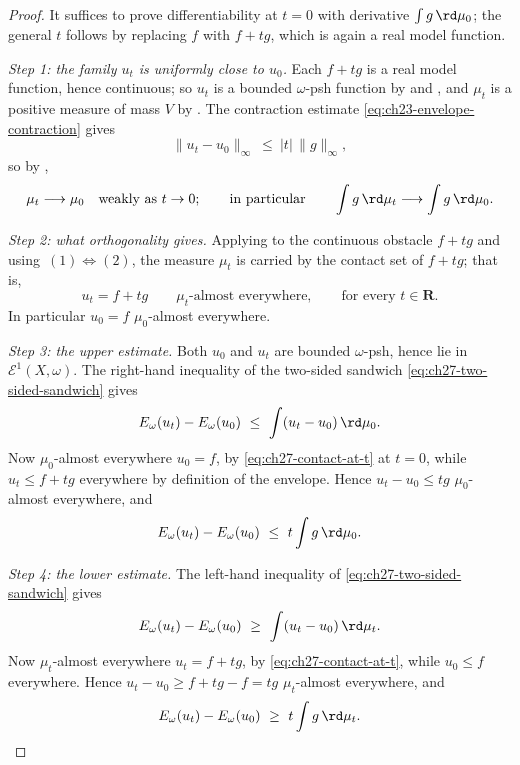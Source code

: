 \begin{proof}
It suffices to prove differentiability at $t=0$ with derivative
$\int g\,\rd\mu_0$; the general $t$ follows by replacing $f$ with
$f+tg$, which is again a real model function.

\emph{Step 1: the family $u_t$ is uniformly close to $u_0$.}
Each $f+tg$ is a real model function, hence continuous; so
$u_t$ is a bounded $\omega$-psh function by
 and
, and $\mu_t$ is a positive measure of
mass $V$ by .  The contraction estimate
\eqref{eq:ch23-envelope-contraction} gives
\begin{equation}\label{eq:ch27-envelope-lipschitz-in-t}
 \lVert u_t-u_0\rVert_\infty\ \leq\ |t|\,\lVert g\rVert_\infty ,
\end{equation}
so by ,
\begin{equation}\label{eq:ch27-measures-converge}
 \mu_t\longrightarrow\mu_0
 \quad\text{weakly as }t\to0;
 \qquad\text{in particular}\qquad
 \int g\,\rd\mu_t\longrightarrow\int g\,\rd\mu_0 .
\end{equation}

\emph{Step 2: what orthogonality gives.}
Applying  to the continuous obstacle
$f+tg$ and using
\,$(1)\Leftrightarrow(2)$, the
measure $\mu_t$ is carried by the contact set of $f+tg$; that is,
\begin{equation}\label{eq:ch27-contact-at-t}
 u_t=f+tg
 \qquad\mu_t\text{-almost everywhere},
 \qquad\text{for every }t\in\mathbf R .
\end{equation}
In particular $u_0=f$ $\mu_0$-almost everywhere.

\emph{Step 3: the upper estimate.}
Both $u_0$ and $u_t$ are bounded $\omega$-psh, hence lie in
$\mathcal E^1(X,\omega)$.  The right-hand inequality of the two-sided
sandwich \eqref{eq:ch27-two-sided-sandwich} gives
\[
 E_\omega(u_t)-E_\omega(u_0)\ \leq\ \int(u_t-u_0)\,\rd\mu_0 .
\]
Now $\mu_0$-almost everywhere $u_0=f$, by \eqref{eq:ch27-contact-at-t}
at $t=0$, while $u_t\leq f+tg$ everywhere by definition of the envelope.
Hence $u_t-u_0\leq tg$ $\mu_0$-almost everywhere, and
\begin{equation}\label{eq:ch27-upper-estimate}
 E_\omega(u_t)-E_\omega(u_0)\ \leq\ t\int g\,\rd\mu_0 .
\end{equation}

\emph{Step 4: the lower estimate.}
The left-hand inequality of \eqref{eq:ch27-two-sided-sandwich} gives
\[
 E_\omega(u_t)-E_\omega(u_0)\ \geq\ \int(u_t-u_0)\,\rd\mu_t .
\]
Now $\mu_t$-almost everywhere $u_t=f+tg$, by
\eqref{eq:ch27-contact-at-t}, while $u_0\leq f$ everywhere.  Hence
$u_t-u_0\geq f+tg-f=tg$ $\mu_t$-almost everywhere, and
\begin{equation}\label{eq:ch27-lower-estimate}
 E_\omega(u_t)-E_\omega(u_0)\ \geq\ t\int g\,\rd\mu_t .
\end{equation}


\end{proof}
